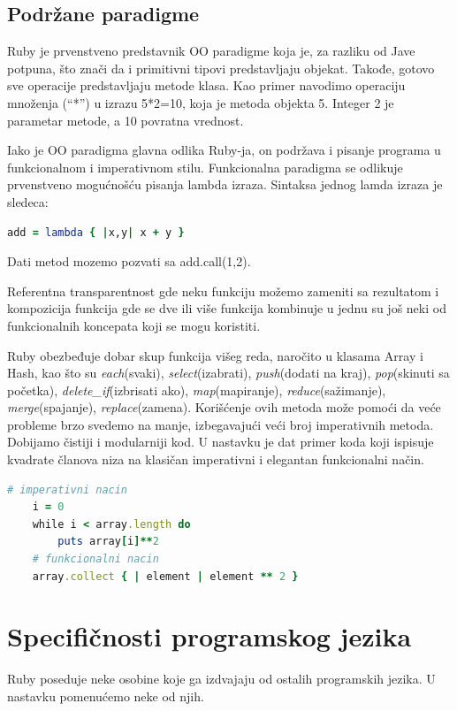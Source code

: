 \documentclass[a4paper]{article}
\begin{document}
\subsection{Podržane paradigme}
Ruby je prvenstveno predstavnik OO paradigme koja je, za razliku od Jave potpuna, što znači da i primitivni tipovi predstavljaju objekat. Takođe, gotovo sve operacije predstavljaju metode klasa. Kao primer navodimo operaciju množenja (“*”) u izrazu 5*2=10, koja je metoda objekta 5. Integer 2 je parametar metode, a 10 povratna vrednost.

Iako je OO paradigma glavna odlika Ruby-ja, on podržava i pisanje programa u funkcionalnom i imperativnom stilu. Funkcionalna paradigma se odlikuje prvenstveno mogućnošću pisanja lambda izraza. Sintaksa jednog lamda izraza je sledeca:
\begin{lstlisting}[language=Ruby]
	add = lambda { |x,y| x + y }
\end{lstlisting}\vspace*{-15pt}
Dati metod mozemo pozvati sa add.call(1,2).

Referentna transparentnost gde neku funkciju možemo zameniti sa rezultatom i kompozicija funkcija gde se dve ili više funkcija kombinuje u jednu su još neki od funkcionalnih koncepata koji se mogu koristiti.

Ruby obezbeđuje dobar skup funkcija višeg reda, naročito u klasama Array i Hash, kao što su \emph{each}(svaki), \emph{select}(izabrati), \emph{push}(dodati na kraj), \emph{pop}(skinuti sa početka), \emph{delete\_if}(izbrisati ako), \emph{map}(mapiranje), \emph{reduce}(sažimanje), \emph{merge}(spajanje), \emph{replace}(zamena). Korišćenje ovih metoda može pomoći da veće probleme brzo svedemo na manje, izbegavajući veći broj imperativnih metoda. Dobijamo čistiji i modularniji kod. U nastavku je dat primer koda koji ispisuje kvadrate članova niza na klasičan imperativni i elegantan funkcionalni način.
\begin{lstlisting}[language=Ruby]
	# imperativni nacin
	i = 0
	while i < array.length do 				
		puts array[i]**2	
	# funkcionalni nacin
	array.collect { | element | element ** 2 }	
\end{lstlisting}\vspace*{-15pt}
\section{Specifičnosti programskog jezika}
Ruby poseduje neke osobine koje ga izdvajaju od ostalih programskih jezika. U nastavku pomenućemo neke od njih. 
\end{document}
